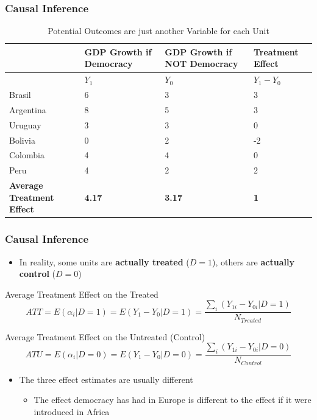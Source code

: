 \documentclass[xcolor=x11names,compress]{beamer}\usepackage[]{graphicx}\usepackage[]{color}
\renewcommand{\(}{\begin{columns}}
\renewcommand{\)}{\end{columns}}
\newcommand{\<}[1]{\begin{column}{#1}}
\renewcommand{\>}{\end{column}}
\begin{document}
\begin{frame}
\frametitle{Causal Inference}
\footnotesize
\begin{table}[htbp]
  \centering
  \caption{Potential Outcomes are just another Variable for each Unit}
    \begin{tabular}{|p{2.4cm}|p{2.4cm}|p{2.4cm}|p{2.4cm}|}
    \hline
          & \multicolumn{1}{p{2.4cm}|}{GDP Growth if Democracy} & \multicolumn{1}{p{2.4cm}|}{GDP Growth if  NOT Democracy} &  Treatment Effect\bigstrut\\
    \hline
          & \multicolumn{1}{l|}{$Y_1$} & \multicolumn{1}{l|}{$Y_0$} & \multicolumn{1}{l|}{$Y_1-Y_0$} \bigstrut\\
    \hline
    Brasil & 6     & 3     & 3 \bigstrut\\
    \hline
    Argentina & 8    & 5     & 3 \bigstrut\\
    \hline
    Uruguay & 3 & 3 & 0  \bigstrut\\
    \hline
    Bolivia & 0     & 2     & -2 \bigstrut\\
    \hline
    Colombia & 4    & 4    & 0 \bigstrut\\
    \hline
    Peru & 4     & 2     & 2 \bigstrut\\
    \hline
    \textbf{Average Treatment Effect} & \textbf{4.17} & \textbf{3.17} & \textbf{1}   \bigstrut\\
    \hline
    \end{tabular}%
  \label{tab:addlabel}%
\end{table}%
\normalsize
\end{frame}

\begin{frame}
\frametitle{Causal Inference}
\begin{itemize}
\item In reality, some units are \textbf{actually treated} ($D=1$), others are \textbf{actually control} ($D=0$)
\end{itemize}
\pause
\footnotesize
\begin{block}{Average Treatment Effect on the Treated}
\begin{equation}
ATT=E(\alpha_i|D=1) = E (Y_1 - Y_0|D=1) = \frac{\sum_i (Y_{1i} - Y_{0i}|D=1)}{N_{Treated}}
\end{equation}
\end{block}
\pause
\begin{block}{Average Treatment Effect on the Untreated (Control)}
\footnotesize
\begin{equation}
ATU=E(\alpha_i|D=0) = E (Y_1 - Y_0|D=0) = \frac{\sum_i (Y_{1i} - Y_{0i}|D=0)}{N_{Control}}
\end{equation}
\end{block}
\normalsize
\pause
\begin{itemize}
\item The three effect estimates are usually different
\begin{itemize}
\item The effect democracy has had in Europe is different to the effect if it were introduced in Africa
\end{itemize}
\end{itemize}
\end{frame}
\end{document}
